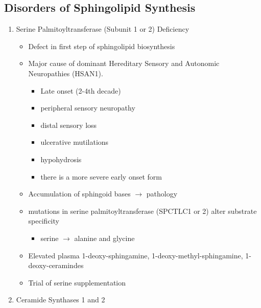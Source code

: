\documentclass{scrartcl}
\begin{document}
\subsection{Disorders of Sphingolipid Synthesis}
\label{sec:org1ca97df}
\begin{enumerate}
\item Serine Palmitoyltransferase (Subunit 1 or 2) Deficiency
\label{sec:orgc6a1302}

\begin{itemize}
\item Defect in first step of sphingolipid biosynthesis
\item Major cause of dominant Hereditary Sensory and Autonomic Neuropathies (HSAN1).
\begin{itemize}
\item Late onset (2-4th decade)
\item peripheral sensory neuropathy
\item distal sensory loss
\item ulcerative mutilations
\item hypohydrosis
\item there is a more severe early onset form
\end{itemize}
\item Accumulation of sphingoid bases \(\to\) pathology
\item mutations in serine palmitoyltransferase (SPCTLC1 or 2) alter
substrate specificity
\begin{itemize}
\item serine \(\to\) alanine and glycine
\end{itemize}
\item Elevated plasma 1-deoxy-sphingamine, 1-deoxy-methyl-sphingamine, 1-deoxy-ceramindes
\item Trial of serine supplementation
\end{itemize}

\item Ceramide Synthases 1 and 2
\label{sec:orgca21d63}


\end{enumerate}
\end{document}
